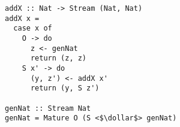 \begin{figure}[!t]
  \centering
  \begin{minipage}{\columnwidth}
    \begin{lstlisting}[label={add_x}, caption={Function for \lstinline{addo in out out} direction}, captionpos=b, frame=tb]
addX :: Nat -> Stream (Nat, Nat)
addX x =
  case x of
    O -> do
      z <- genNat
      return (z, z)
    S x' -> do
      (y, z') <- addX x'
      return (y, S z')

genNat :: Stream Nat
genNat = Mature O (S <$\dollar$> genNat)
    \end{lstlisting}
  \end{minipage}
\end{figure}